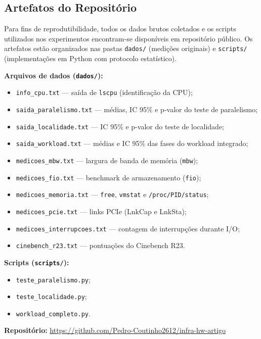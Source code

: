 \documentclass[
	12pt,
	openright,
	oneside,
	a4paper,
	english,
	brazil
	]{abntex2}
\begin{document}
\begin{anexosenv}

\partanexos

\chapter{Artefatos do Repositório}
\label{anexo:artefatos}

Para fins de reprodutibilidade, todos os dados brutos coletados e os scripts utilizados nos experimentos encontram-se disponíveis em repositório público. Os artefatos estão organizados nas pastas \texttt{dados/} (medições originais) e \texttt{scripts/} (implementações em Python com protocolo estatístico).

\noindent\textbf{Arquivos de dados (\texttt{dados/}):}
\begin{itemize}
    \item \texttt{info\_cpu.txt} — saída de \texttt{lscpu} (identificação da CPU);
    \item \texttt{saida\_paralelismo.txt} — médias, IC 95\% e p-valor do teste de paralelismo;
    \item \texttt{saida\_localidade.txt} — IC 95\% e p-valor do teste de localidade;
    \item \texttt{saida\_workload.txt} — médias e IC 95\% das fases do workload integrado;
    \item \texttt{medicoes\_mbw.txt} — largura de banda de memória (\texttt{mbw});
    \item \texttt{medicoes\_fio.txt} — benchmark de armazenamento (\texttt{fio});
    \item \texttt{medicoes\_memoria.txt} — \texttt{free}, \texttt{vmstat} e \texttt{/proc/PID/status};
    \item \texttt{medicoes\_pcie.txt} — links PCIe (LnkCap e LnkSta);
    \item \texttt{medicoes\_interrupcoes.txt} — contagem de interrupções durante I/O;
    \item \texttt{cinebench\_r23.txt} — pontuações do Cinebench R23.
\end{itemize}

\noindent\textbf{Scripts (\texttt{scripts/}):}
\begin{itemize}
    \item \texttt{teste\_paralelismo.py};
    \item \texttt{teste\_localidade.py};
    \item \texttt{workload\_completo.py}.
\end{itemize}

\noindent\textbf{Repositório:} \url{https://github.com/Pedro-Coutinho2612/infra-hw-artigo}

\end{anexosenv}
\end{document}
